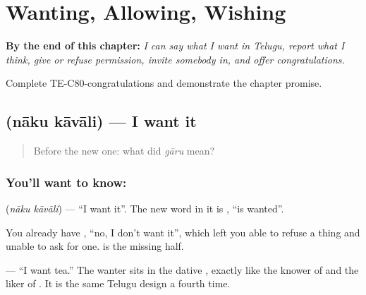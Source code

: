 
\chapter{Wanting, Allowing, Wishing}
\label{ch:te-wanting-allowing-wishing}

\begin{chapteropening}
\textbf{By the end of this chapter:} \emph{I can say what I want in Telugu, report what I think, give or refuse permission, invite somebody in, and offer congratulations.}

Complete TE-C80-congratulations and demonstrate the chapter promise.
\end{chapteropening}

\section[\texorpdfstring{\te{నాకు} \te{కావాలి} (nāku kāvāli)}{నాకు కావాలి (nāku kāvāli)}]{  (nāku kāvāli) — I want it}

\label{lesson:TE-C80-want}



\begin{quote}
Before the new one: what did \emph{gāru} mean?
\end{quote}

\subsection*{You'll want to know:  }
\textbf{ } (\emph{nāku kāvāli}) — \textquotedblleft{}I want it\textquotedblright{}. The new word in it is \textbf{}, \textquotedblleft{}is wanted\textquotedblright{}.

You already have \textbf{}, \textquotedblleft{}no, I don't want it\textquotedblright{}, which left you able to refuse a thing and unable to ask for one.  is the missing half.

\textbf{  } — \textquotedblleft{}I want tea.\textquotedblright{} The wanter sits in the dative , exactly like the knower of  and the liker of . It is the same Telugu design a fourth time.

